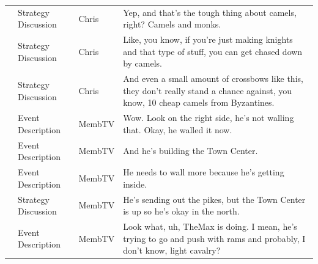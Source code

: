 {\begin{longtable}{@{}>{\theAppRow}r|L{2.3cm}L{1.0cm}U{11.55cm}@{}}
    & Strategy Discussion   & Chris        & Yep, and that's the tough thing about camels, right? Camels and monks.                                                                                                                                                                                           \\
    & Strategy Discussion   & Chris        & Like, you know, if you're just making knights and that type of stuff, you can get chased down by camels.                                                                                                                                                         \\
    & Strategy Discussion   & Chris        & And even a small amount of crossbows like this, they don't really stand a chance against, you know, 10 cheap camels from Byzantines.                                                                                                                             \\
    & Event Description     & MembTV       & Wow. Look on the right side, he's not walling that. Okay, he walled it now.                                                                                                                                                                                      \\
    & Event Description     & MembTV       & And he's building the Town Center.                                                                                                                                                                                                                               \\
    & Event Description     & MembTV       & He needs to wall more because he's getting inside.                                                                                                                                                                                                               \\
    & Strategy Discussion   & MembTV       & He's sending out the pikes, but the Town Center is up so he's okay in the north.                                                                                                                                                                                 \\
    & Event Description     & MembTV       & Look what, uh, TheMax is doing. I mean, he's trying to go and push with rams and probably, I don't know, light cavalry?                                                                                                                                          \\

\end{longtable}}
